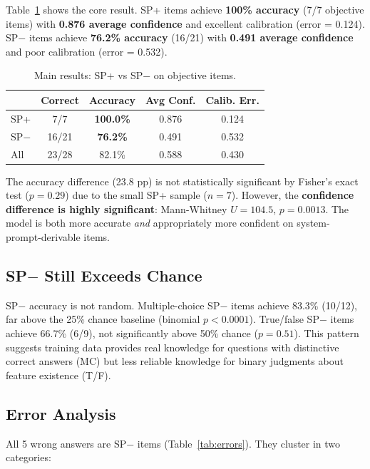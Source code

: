 \documentclass[10pt,twocolumn]{article}
\begin{document}
Table~\ref{tab:main} shows the core result.
SP+ items achieve \textbf{100\% accuracy} (7/7 objective items) with \textbf{0.876 average confidence} and excellent calibration (error = 0.124).
SP$-$ items achieve \textbf{76.2\% accuracy} (16/21) with \textbf{0.491 average confidence} and poor calibration (error = 0.532).

\begin{table}[t]
\centering
\caption{Main results: SP+ vs SP$-$ on objective items.}
\label{tab:main}
\small
\begin{tabular}{@{}lcccc@{}}
\toprule
& \textbf{Correct} & \textbf{Accuracy} & \textbf{Avg Conf.} & \textbf{Calib. Err.} \\
\midrule
SP+ & 7/7  & \textcolor{spplus}{\textbf{100.0\%}} & 0.876 & 0.124 \\
SP$-$ & 16/21 & \textcolor{spminus}{\textbf{76.2\%}} & 0.491 & 0.532 \\
\midrule
All & 23/28 & 82.1\% & 0.588 & 0.430 \\
\bottomrule
\end{tabular}
\end{table}

The accuracy difference (23.8 pp) is not statistically significant by Fisher's exact test ($p{=}0.29$) due to the small SP+ sample ($n{=}7$).
However, the \textbf{confidence difference is highly significant}: Mann-Whitney $U{=}104.5$, $p{=}0.0013$.
The model is both more accurate \textit{and} appropriately more confident on system-prompt-derivable items.

\subsection{SP$-$ Still Exceeds Chance}

SP$-$ accuracy is not random.
Multiple-choice SP$-$ items achieve 83.3\% (10/12), far above the 25\% chance baseline (binomial $p{<}0.0001$).
True/false SP$-$ items achieve 66.7\% (6/9), not significantly above 50\% chance ($p{=}0.51$).
This pattern suggests training data provides real knowledge for questions with distinctive correct answers (MC) but less reliable knowledge for binary judgments about feature existence (T/F).

\subsection{Error Analysis}

All 5 wrong answers are SP$-$ items (Table~\ref{tab:errors}).
They cluster in two categories:
\end{document}
